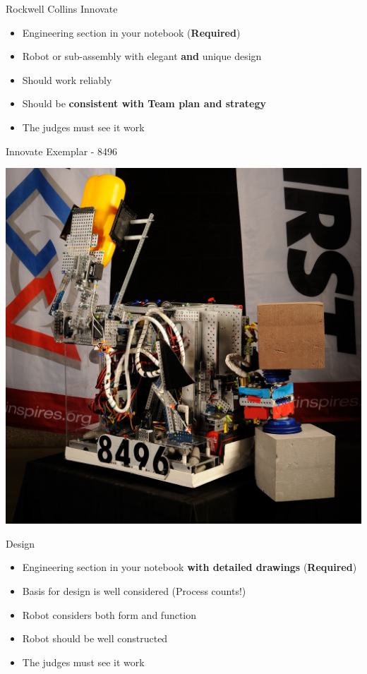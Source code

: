 \documentclass{beamer}
\begin{document}
  \begin{frame}{Rockwell Collins Innovate}
    \begin{itemize}
    \item Engineering section in your notebook (\textbf{Required})\pause
    \item Robot or sub-assembly with elegant \textbf{and} unique design \pause
    \item Should work reliably \pause
    \item Should be \textbf{consistent with Team plan and strategy} \pause
    \item The judges must see it work
    \end{itemize}
  \end{frame}

  \begin{frame}{Innovate Exemplar - 8496}
    \begin{center}
      \includegraphics[width=.7\textwidth]{8496_innovate}
    \end{center}
  \end{frame}

  \begin{frame}{Design}
    \begin{itemize}
    \item Engineering section in your notebook \textbf{with detailed drawings}  (\textbf{Required})\pause
    \item Basis for design is well considered (Process counts!) \pause
    \item Robot considers both form and function \pause
    \item Robot should be well constructed
    \item The judges must see it work
    \end{itemize}
  \end{frame}
\end{document}
